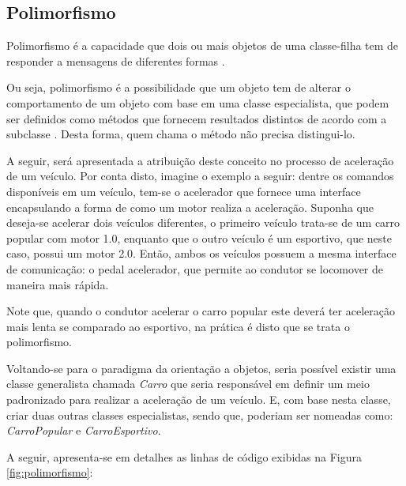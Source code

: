 \subsection{Polimorfismo}

Polimorfismo é a capacidade que dois ou mais objetos de uma classe-filha tem  de
responder a mensagens de diferentes formas
\cite{php5ConceitosProgramacaoEIntegracaoComBancoDeDados}.

Ou seja, polimorfismo é a possibilidade que um objeto tem de alterar o
comportamento de um objeto com base em uma classe especialista, que podem
ser definidos como métodos que fornecem resultados distintos de acordo com a
subclasse \cite{php5ConceitosProgramacaoEIntegracaoComBancoDeDados}. Desta forma, quem
chama o método não precisa distingui-lo.

A seguir, será apresentada a atribuição deste conceito no processo de aceleração
de um veículo. Por conta disto, imagine o exemplo a seguir: dentre os comandos
disponíveis em um veículo, tem-se o acelerador que fornece uma interface
encapsulando a forma de como um motor realiza a aceleração. Suponha que
deseja-se acelerar dois veículos diferentes, o primeiro veículo trata-se de um 
carro popular com motor 1.0, enquanto que o outro veículo é um esportivo, que
neste caso, possui um motor 2.0. Então, ambos os veículos possuem a mesma
interface de comunicação: o pedal acelerador, que permite ao condutor se
locomover de maneira mais rápida.

Note que, quando o condutor acelerar o carro popular este deverá ter aceleração
mais lenta se comparado ao esportivo, na prática é disto que se trata o polimorfismo.

Voltando-se para o paradigma da orientação a objetos, seria possível existir uma
classe generalista chamada \textit{Carro} que seria responsável em definir um
meio padronizado para realizar a aceleração de um veículo. E, com base nesta
classe, criar duas outras classes especialistas, sendo que, poderiam ser
nomeadas como: \textit{CarroPopular} e \textit{CarroEsportivo}.

A seguir, apresenta-se em detalhes as linhas de código exibidas na Figura
\ref{fig:polimorfismo}:

